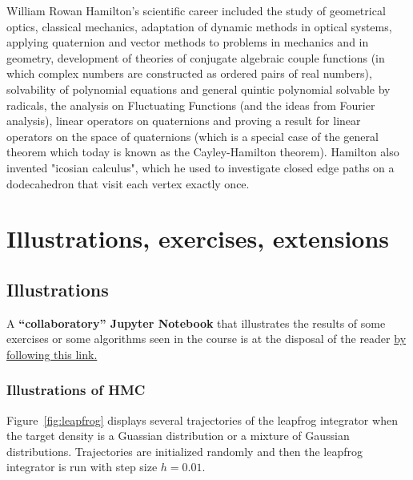 \documentclass[english,graybox,envcountchap,envcountsame,sectrefs,shortlabels]{svmono}
\theoremstyle{style}
\begin{document}
\begin{subappendices}
William Rowan Hamilton's scientific career included the study of geometrical optics, classical mechanics, adaptation of dynamic methods in optical systems, applying quaternion and vector methods to problems in mechanics and in geometry, development of theories of conjugate algebraic couple functions (in which complex numbers are constructed as ordered pairs of real numbers), solvability of polynomial equations and general quintic polynomial solvable by radicals, the analysis on Fluctuating Functions (and the ideas from Fourier analysis), linear operators on quaternions and proving a result for linear operators on the space of quaternions (which is a special case of the general theorem which today is known as the Cayley-Hamilton theorem). Hamilton also invented "icosian calculus", which he used to investigate closed edge paths on a dodecahedron that visit each vertex exactly once.
\end{subappendices}




\chapter{Illustrations, exercises, extensions}

\section{Illustrations}
A \textbf{``collaboratory'' Jupyter Notebook} that illustrates the
results of some exercises or some algorithms seen in the course is
at the disposal of the reader \href{https://colab.research.google.com/drive/1Ey5TNx-_74gPH0FG-rhXSuGGok0T10wS\#}{by following this link.}

\subsection{Illustrations of HMC}
Figure~\ref{fig:leapfrog} displays several trajectories of the leapfrog integrator when the target density is a Guassian distribution or a mixture of Gaussian distributions. Trajectories are initialized randomly and then the leapfrog integrator is run with step size $h= 0.01$.
\end{document}
